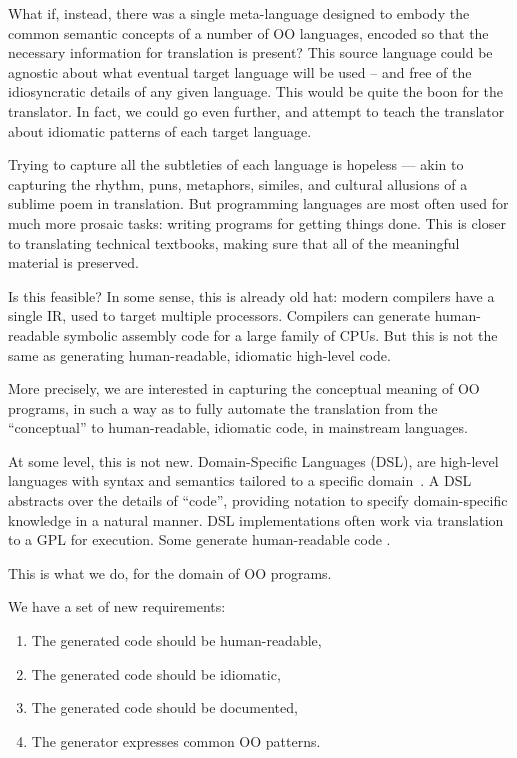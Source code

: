 \documentclass[sigplan,review,anonymous,prologue,dvipsnames]{acmart}
\begin{document}
What if, instead, there was a single meta-language designed to embody
the common semantic concepts of a number of OO languages, encoded so that the
necessary information for translation is present?  This source language could
be agnostic about what eventual target language will be used -- and free of
the idiosyncratic details of any given language.  This would be quite the boon
for the translator.  In fact, we could go even further, and attempt to
teach the translator about idiomatic patterns of each target language.

Trying to capture all the subtleties of each language is hopeless ---
akin to capturing the rhythm, puns, metaphors, similes,
and cultural allusions of a sublime poem in translation.  But programming
languages are most often used for much more prosaic tasks: writing programs
for getting things done. This is closer to translating technical textbooks,
making sure that all of the meaningful material is preserved.

Is this feasible? In some sense, this is already old hat:
modern compilers have a single IR,
used to target multiple processors. Compilers can generate
human-readable symbolic assembly code for a large family of CPUs. But this
is not the same as generating human-readable, idiomatic high-level
code.

More precisely, we are interested in capturing the conceptual meaning of
OO programs, in such a way as to fully automate the translation from
the ``conceptual'' to human-readable, idiomatic code, in mainstream
languages.

At some level, this is not new.  Domain-Specific Languages (DSL),
are high-level languages with syntax and semantics tailored to a specific
domain~\cite{mernik2005and}.  A DSL
abstracts over the details of ``code'', providing notation to
specify domain-specific knowledge in a natural manner. DSL implementations
often work via translation to a GPL for execution.  Some generate
human-readable code \cite{wang1997zephyr, mooij2013gaining, hong2012green, 
beyak2011saga}.

This is what we do, for the domain of OO programs.

We have a set of new requirements:
\begin{enumerate}
\item The generated code should be human-readable,
\item The generated code should be idiomatic,
\item The generated code should be documented,
\item The generator expresses common OO patterns.
\end{enumerate}
\end{document}
